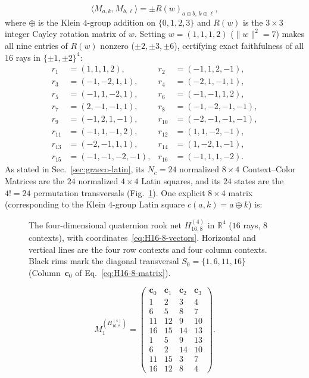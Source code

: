 \documentclass[aps,pra,reprint,superscriptaddress,longbibliography,nofootinbib,floatfix,10pt]{revtex4-2}
\theoremstyle{definition}\newtheorem{definition}[theorem]{Definition}
\theoremstyle{remark}\newtheorem{remark}[theorem]{Remark}
\begin{document}
\begin{itemize}
\begin{equation}\label{eq:quat-ip-formula}
\langle M_{a,k},M_{b,\ell}\rangle = \pm R(w)_{a\oplus b,\,k\oplus\ell},
\end{equation}
where $\oplus$ is the Klein $4$-group addition on $\{0,1,2,3\}$ and $R(w)$ is the $3\times 3$ integer Cayley rotation matrix of $w$. Setting $w=(1,1,1,2)$ ($\|w\|^2=7$) makes all nine entries of $R(w)$ nonzero ($\pm 2,\pm 3,\pm 6$), certifying exact faithfulness of all $16$ rays in $\{\pm 1,\pm 2\}^4$:
\begin{equation}\label{eq:H16-8-vectors}
\begin{aligned}
r_1&=(1,1,1,2),&r_2&=(-1,1,2,-1),\\
r_3&=(-1,-2,1,1),&r_4&=(-2,1,-1,1),\\
r_5&=(-1,1,-2,1),&r_6&=(-1,-1,1,2),\\
r_7&=(2,-1,-1,1),&r_8&=(-1,-2,-1,-1),\\
r_9&=(-1,2,1,-1),&r_{10}&=(-2,-1,-1,-1),\\
r_{11}&=(-1,1,-1,2),&r_{12}&=(1,1,-2,-1),\\
r_{13}&=(-2,-1,1,1),&r_{14}&=(1,-2,1,-1),\\
r_{15}&=(-1,-1,-2,-1),&r_{16}&=(-1,1,1,-2).
\end{aligned}
\end{equation}
As stated in Sec.~\ref{sec:graeco-latin}, its $N_c=24$ normalized $8\times 4$ Context--Color Matrices are the $24$ normalized $4\times 4$ Latin squares, and its $24$ states are the $4!=24$ permutation transversals (Fig.~\ref{fig:rook16-hypergraph}). One explicit $8\times 4$ matrix (corresponding to the Klein $4$-group Latin square $c(a,k)=a\oplus k$) is:
\begin{figure}[!tbp]
\centering

\caption{The four-dimensional quaternion rook net $H_{16,8}^{(4)}$ in $\mathbb R^4$ ($16$ rays, $8$ contexts), with coordinates~\eqref{eq:H16-8-vectors}. Horizontal and vertical lines are the four row contexts and four column contexts. Black rims mark the diagonal transversal $S_0=\{1,6,11,16\}$ (Column~$\mathbf{c}_0$ of Eq.~\eqref{eq:H16-8-matrix}).}\label{fig:rook16-hypergraph}
\end{figure}
\begin{equation}\label{eq:H16-8-matrix}
M_1^{(H_{16,8}^{(4)})}=\begin{pmatrix}
\mathbf{c}_0 & \mathbf{c}_1 & \mathbf{c}_2 & \mathbf{c}_3\\\hline
1 & 2 & 3 & 4\\
6 & 5 & 8 & 7\\
11 & 12 & 9 & 10\\
16 & 15 & 14 & 13\\\hline
1 & 5 & 9 & 13\\
6 & 2 & 14 & 10\\
11 & 15 & 3 & 7\\
16 & 12 & 8 & 4
\end{pmatrix}.
\end{equation}


\end{itemize}
\end{document}
